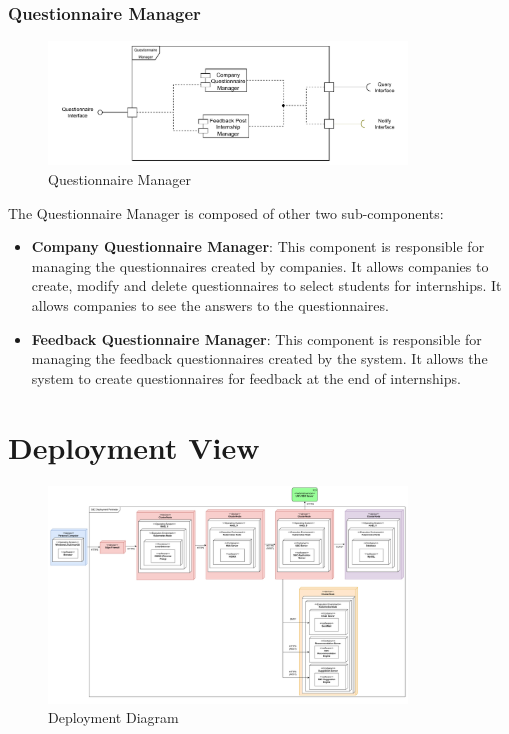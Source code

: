 \subsubsection{Questionnaire Manager}
\label{subsub:questionnaire-manager}%

\begin{figure}[H]
      \centering
      \includegraphics[width=0.85\textwidth]{Images/Questionnaire_Architecture.pdf}
      \caption{Questionnaire Manager}
      \label{questionnaire-manager-arch}
\end{figure}

\par The Questionnaire Manager is composed of other two sub-components:
\begin{itemize}
      \item \textbf{Company Questionnaire Manager}: This component is responsible for managing the questionnaires created by companies.
            It allows companies to create, modify and delete questionnaires to select students for internships.
            It allows companies to see the answers to the questionnaires.
      \item \textbf{Feedback Questionnaire Manager}: This component is responsible for managing the feedback questionnaires created by the system.
            It allows the system to create questionnaires for feedback at the end of internships.
\end{itemize}

\section{Deployment View}
\label{sec:deployment-view}%

\begin{figure}[H]
      \centering
      \includegraphics[width=0.85\textwidth]{Images/Deployment_Diagram.pdf}
      \caption{Deployment Diagram}
      \label{fig:deployment-diagram}
\end{figure}

